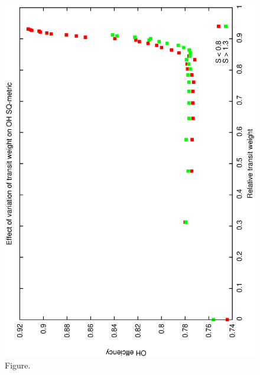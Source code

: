 \documentclass[12pt,a4paper]{article}
\begin{document}
\begin{figure}[htbp]
 \begin{center}
  \includegraphics[scale=1.0, angle=0]{figures/oh1.eps}
 \end{center}
  \caption[Figure.]
{Figure.}
\end{figure}
\clearpage
\end{document}

